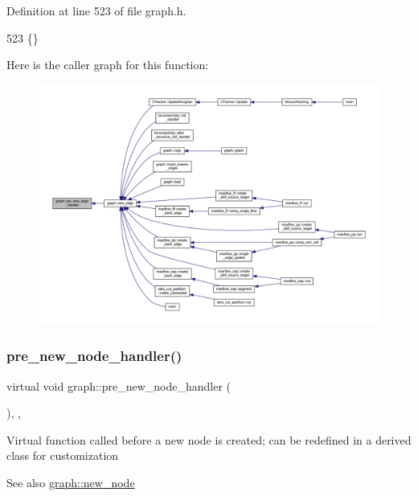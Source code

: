 Definition at line 523 of file graph.\+h.


\begin{DoxyCode}
523 \{\}    
\end{DoxyCode}
Here is the caller graph for this function\+:
\nopagebreak
\begin{figure}[H]
\begin{center}
\leavevmode
\includegraphics[width=350pt]{classgraph_a0a7a68fa0baa47ef955525c445fa1a04_icgraph}
\end{center}
\end{figure}
\mbox{\label{classgraph_afb7606eaa8d673b6599af24437c0546c}} 
\subsubsection{\texorpdfstring{pre\+\_\+new\+\_\+node\+\_\+handler()}{pre\_new\_node\_handler()}}
{\footnotesize\ttfamily virtual void graph\+::pre\+\_\+new\+\_\+node\+\_\+handler (\begin{DoxyParamCaption}{ }\end{DoxyParamCaption})\hspace{0.3cm}{\ttfamily [inline]}, {\ttfamily [virtual]}, {\ttfamily [inherited]}}

Virtual function called before a new node is created; can be redefined in a derived class for customization

\begin{DoxySeeAlso}{See also}
\mbox{\hyperlink{classgraph_ab9505335c20558319b6cce25aed23524}{graph\+::new\+\_\+node}} 
\end{DoxySeeAlso}


